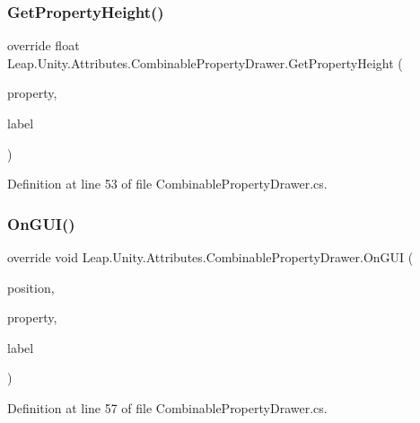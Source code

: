 \subsubsection{\texorpdfstring{GetPropertyHeight()}{GetPropertyHeight()}}
{\footnotesize\ttfamily override float Leap.\+Unity.\+Attributes.\+Combinable\+Property\+Drawer.\+Get\+Property\+Height (\begin{DoxyParamCaption}\item[{Serialized\+Property}]{property,  }\item[{G\+U\+I\+Content}]{label }\end{DoxyParamCaption})}



Definition at line 53 of file Combinable\+Property\+Drawer.\+cs.

\mbox{\label{class_leap_1_1_unity_1_1_attributes_1_1_combinable_property_drawer_a8e71381312b2d09a68daa42fa49e7653}} 
\subsubsection{\texorpdfstring{OnGUI()}{OnGUI()}\hspace{0.1cm}{\footnotesize\ttfamily [1/2]}}
{\footnotesize\ttfamily override void Leap.\+Unity.\+Attributes.\+Combinable\+Property\+Drawer.\+On\+G\+UI (\begin{DoxyParamCaption}\item[{Rect}]{position,  }\item[{Serialized\+Property}]{property,  }\item[{G\+U\+I\+Content}]{label }\end{DoxyParamCaption})}



Definition at line 57 of file Combinable\+Property\+Drawer.\+cs.

\mbox{\label{class_leap_1_1_unity_1_1_attributes_1_1_combinable_property_drawer_aa6d7097d50d005bc1f34562335bee772}} 

